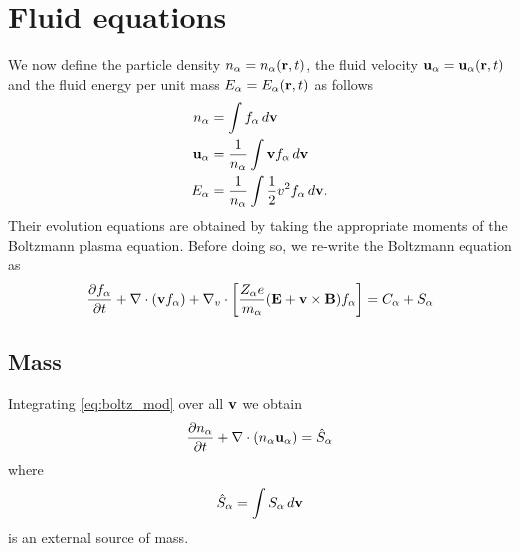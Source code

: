\documentclass[a4paper,11pt]{report}
\begin{document}
\chapter{Fluid equations}
We now define the particle density $n_\alpha = n_\alpha(\mathbf{r},t)$, the fluid velocity $\mathbf{u}_\alpha = \mathbf{u}_\alpha(\mathbf{r},t)$ and the fluid energy per unit mass $E_\alpha = E_\alpha(\mathbf{r},t)$ as follows
\begin{align}
n_\alpha &= \int f_\alpha \, d\mathbf{v} \\
\mathbf{u}_\alpha &= \frac{1}{n_\alpha} \int \mathbf{v} f_\alpha \, d\mathbf{v} \\
E_\alpha &= \frac{1}{n_\alpha} \int \frac{1}{2} v^2 f_\alpha \, d\mathbf{v}.
\end{align}
Their evolution equations are obtained by taking the appropriate moments of the Boltzmann plasma equation. Before doing so, we re-write the Boltzmann equation as
\begin{equation}
\label{eq:boltz_mod}
\frac{\partial f_\alpha}{\partial t} + \nabla \cdot (\mathbf{v} f_\alpha) + \nabla_v \cdot \left [ \frac{Z_\alpha e}{m_\alpha} ( \mathbf{E} + \mathbf{v} \times \mathbf{B} ) f_\alpha \right ] = C_\alpha + S_\alpha
\end{equation}

\section{Mass}
Integrating \cref{eq:boltz_mod} over all $\mathbf{v}$ we obtain
\begin{equation}
\frac{\partial n_\alpha}{\partial t} + \nabla \cdot \left ( n_\alpha \mathbf{u}_\alpha \right ) = \hat{S}_\alpha
\end{equation}
where 
\begin{equation}
\hat{S}_\alpha = \int S_\alpha \, d\mathbf{v}
\end{equation}
is an external source of mass.

\end{document}
